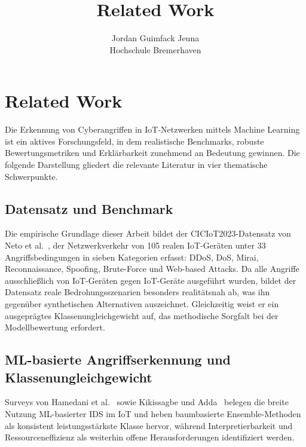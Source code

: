 \documentclass[letterpaper,twocolumn,10pt]{article}
\begin{document}
\date{}
\title{\Large \bf Related Work}
\author{{\rm Jordan Guimfack Jeuna}\\Hochschule Bremerhaven}
\maketitle

\section{Related Work}
\label{sec:related}

Die Erkennung von Cyberangriffen in IoT-Netzwerken mittels Machine
Learning ist ein aktives Forschungsfeld, in dem realistische Benchmarks,
robuste Bewertungsmetriken und Erklärbarkeit zunehmend an Bedeutung
gewinnen. Die folgende Darstellung gliedert die relevante Literatur in
vier thematische Schwerpunkte.

\subsection{Datensatz und Benchmark}

Die empirische Grundlage dieser Arbeit bildet der CICIoT2023-Datensatz
von Neto et al.~\cite{neto2023ciciot2023}, der Netzwerkverkehr von 105
realen IoT-Geräten unter 33 Angriffsbedingungen in sieben Kategorien
erfasst: DDoS, DoS, Mirai, Reconnaissance, Spoofing, Brute-Force und
Web-based Attacks. Da alle Angriffe ausschließlich von IoT-Geräten gegen
IoT-Geräte ausgeführt wurden, bildet der Datensatz reale
Bedrohungsszenarien besonders realitätsnah ab, was ihn gegenüber
synthetischen Alternativen auszeichnet. Gleichzeitig weist er ein
ausgeprägtes Klassenungleichgewicht auf, das methodische Sorgfalt bei
der Modellbewertung erfordert.

\subsection{ML-basierte Angriffserkennung und Klassenungleichgewicht}

Surveys von Hamedani et al.~\cite{hamedani2025iotsurvey} sowie
Kikissagbe und Adda~\cite{kikissagbe2024review} belegen die breite
Nutzung ML-basierter IDS im IoT und heben baumbasierte
Ensemble-Methoden als konsistent leistungsstärkste Klasse hervor,
während Interpretierbarkeit und Ressourceneffizienz als weiterhin offene
Herausforderungen identifiziert werden.
\end{document}
